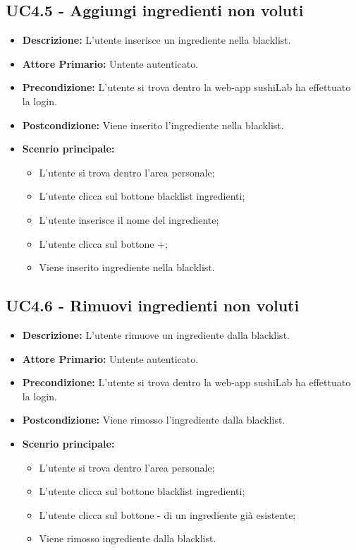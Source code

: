 \subsection{UC4.5 - Aggiungi ingredienti non voluti}
\begin{itemize}
    \item \textbf{Descrizione:} L'utente inserisce un ingrediente nella blacklist.
    \item \textbf{Attore Primario:} Untente autenticato.
    \item \textbf{Precondizione:} L'utente si trova dentro la web-app sushiLab  ha effettuato la login.
    \item \textbf{Postcondizione:} Viene inserito l'ingrediente nella blacklist.
    \item \textbf{Scenrio principale:}
    \begin{itemize}
        \item L'utente si trova dentro l'area personale;
        \item L'utente clicca sul bottone blacklist ingredienti;
        \item L'utente inserisce il nome del ingrediente;
        \item L'utente clicca sul bottone +;
        \item Viene inserito ingrediente nella blacklist.
    \end{itemize}
\end{itemize}
\subsection{UC4.6 - Rimuovi ingredienti non voluti}
\begin{itemize}
    \item \textbf{Descrizione:} L'utente rimuove un ingrediente dalla blacklist.
    \item \textbf{Attore Primario:} Untente autenticato.
    \item \textbf{Precondizione:} L'utente si trova dentro la web-app sushiLab  ha effettuato la login.
    \item \textbf{Postcondizione:} Viene rimosso l'ingrediente dalla blacklist.
    \item \textbf{Scenrio principale:}
    \begin{itemize}
        \item L'utente si trova dentro l'area personale;
        \item L'utente clicca sul bottone blacklist ingredienti;
        \item L'utente clicca sul bottone - di un ingrediente già esistente;
        \item Viene rimosso ingrediente dalla blacklist.
    \end{itemize}
\end{itemize}
